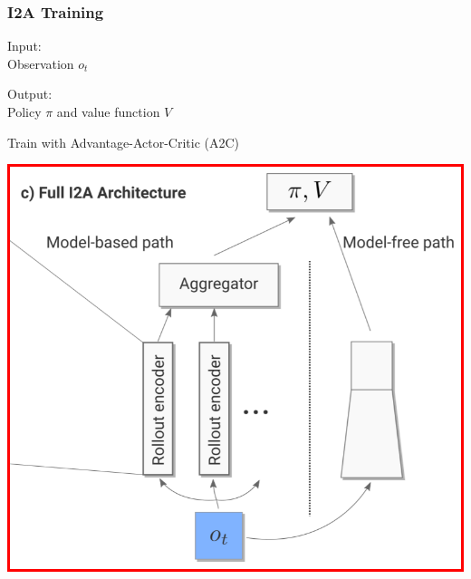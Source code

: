 \begin{frame}
    \frametitle{I2A Training}

\begin{multicols}{2}
	\begin{PraesentationAufzaehlung}
		\item Input:\\
		Observation $o_t$
		\item Output:\\
		Policy $\pi$ and value function $V$
		\item Train with Advantage-Actor-Critic (A2C)
	\end{PraesentationAufzaehlung}
    \vfill\columnbreak
	\begin{center}
    \includegraphics[width=\columnwidth]{./Images/i2a_a2c.png}%
	\end{center}
\end{multicols}
    
\end{frame}
\clearpage






